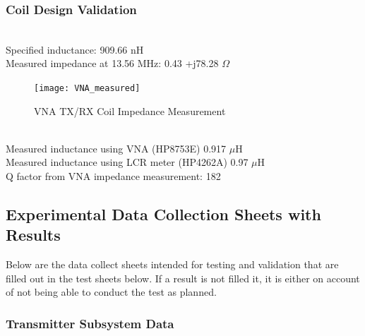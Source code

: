 \documentclass[12pt]{article}
\begin{document}
\hfill \pagebreak

\subsubsection*{Coil Design Validation}\hfill \\
\noindent
Specified inductance: 909.66 nH\\ 
Measured impedance at 13.56 MHz: 0.43 +j78.28 $\Omega$\\
\begin{figure}[h!]
\centering
\texttt{[image: VNA\_measured]}
\caption{VNA TX/RX Coil Impedance Measurement}
\end{figure}
\hfill \\
\noindent 
Measured inductance using VNA (HP8753E) 0.917 $\mu$H\\
Measured inductance using LCR meter (HP4262A) 0.97 $\mu$H\\
Q factor from VNA impedance measurement: 182
\hfill

\pagebreak
\subsection{Experimental Data Collection Sheets with Results}

\noindent
Below are the data collect sheets intended for testing and validation that are filled out in the test sheets below.  If a result is not filled it, it is either on account of not being able to conduct the test as planned.

\subsubsection{Transmitter Subsystem Data}
\hfill
\end{document}
